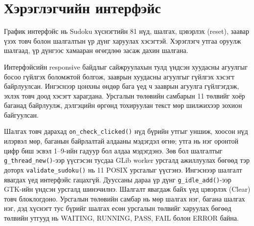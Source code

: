 \documentclass[12pt,a4paper]{report}
\begin{document}
\section{Хэрэглэгчийн интерфэйс}
График интерфэйс нь Sudoku хүснэгтийн 81 нүд, шалгах, цэвэрлэх (reset), заавар үзэх товч болон шалгалтын үр дүнг харуулах хэсэгтэй. Хэрэглэгч утгаа оруулж шалгаад, үр дүнгээс хамааран өгөгдлөө засаж дахин шалгана.

Интерфэйсийн responsive байдлыг сайжруулахын тулд үндсэн хуудасны агуулгыг босоо гүйлгэх боломжтой болгож, зааврын хуудасны агуулгыг гүйлгэх хэсэгт байрлуулсан. Ингэснээр цонхны өндөр бага үед ч зааврын агуулга гүйлгэгдэж, эхлэх товч доод хэсэгт харагдана. Урсгалын төлөвийн самбарын 11 төлвийг хоёр баганад байрлуулж, дэлгэцийн өргөнд тохируулан текст мөр шилжихээр зохион байгуулсан.

Шалгах товч дарахад \texttt{on\_check\_clicked()} нүд бүрийн утгыг уншиж, хоосон нүд илэрвэл мөр, баганын байрлалтай алдааны мэдэгдэл өгнө; утга нь нэг оронтой цифр биш эсвэл 1--9-ийн гадуур бол алдаа мэдэгдэнэ. Зөв бол шалгалтыг \texttt{g\_thread\_new()}-ээр үүсгэсэн тусдаа GLib worker урсгалд ажиллуулах бөгөөд тэр доторх \texttt{validate\_sudoku()} нь 11 POSIX урсгалыг үүсгэнэ. Ингэснээр шалгалт явагдах үед интерфэйс гацахгүй. Дууссаны дараа үр дүнг \texttt{g\_idle\_add()}-ээр GTK-ийн үндсэн урсгалд шинэчилнэ. Шалгалт явагдаж байх үед цэвэрлэх (Clear) товч блоклогдоно. Урсгалын төлөвийн самбар нь мөр шалгах нэг, багана шалгах нэг, дэд хүснэгт тус бүрийг шалгах есөн урсгалын төлвийг харуулах бөгөөд төлвийн утгууд нь WAITING, RUNNING, PASS, FAIL болон ERROR байна.
\end{document}
